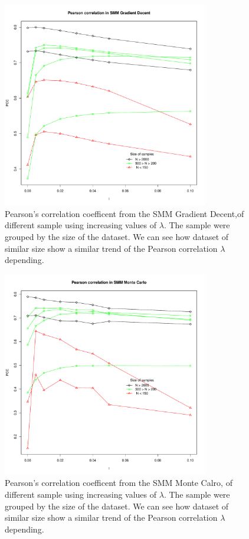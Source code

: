 \documentclass{bioinfo}
\begin{document}
\begin{application}
\begin{figure}[!tpb]
\centerline{\includegraphics[width=9cm]{fig/smm_l005_ppc_size.pdf}}
\caption{Pearson's correlation coefficent  from the SMM Gradient Decent,of different sample using increasing values of $\lambda$. The sample were grouped by the size of the dataset. We can see how dataset of similar size show a similar trend of the Pearson correlation $\lambda$ depending.}
\label{fig:01}
\end{figure}

\begin{figure}[!tpb]
\centerline{\includegraphics[width=9cm]{fig/smm_mc_l005_ppc_size.pdf}}
\caption{Pearson's correlation coefficent from the SMM Monte Calro, of different sample using increasing values of $\lambda$. The sample were grouped by the size of the dataset. We can see how dataset of similar size show a similar trend of the Pearson correlation $\lambda$ depending.}
\label{fig:02}
\end{figure}


\end{application}
\end{document}
